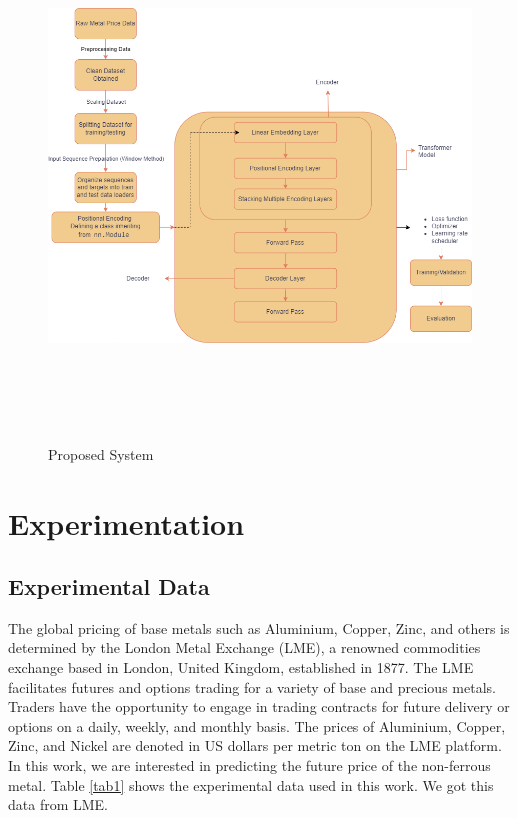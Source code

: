 \documentclass{ws-ijait}
\begin{document}
\begin{center}
	\begin{figure}[!htbp]
		\centering
		\includegraphics[width=15cm, height=14cm]{ps.png}
		\caption{Proposed System}
		\label{figpp}
	\end{figure}
\end{center}



\section{Experimentation}

\subsection{Experimental Data}
The global pricing of base metals such as Aluminium, Copper, Zinc, and others is determined by the London Metal Exchange (LME), a renowned commodities exchange based in London, United Kingdom, established in 1877. The LME facilitates futures and options trading for a variety of base and precious metals. Traders have the opportunity to engage in trading contracts for future delivery or options on a daily, weekly, and monthly basis. The prices of Aluminium, Copper, Zinc, and Nickel are denoted in US dollars per metric ton on the LME platform. In this work, we are interested in predicting the future price of the non-ferrous metal. Table \ref{tab1} shows the experimental data used in this work. We got this data from LME.
\end{document}
